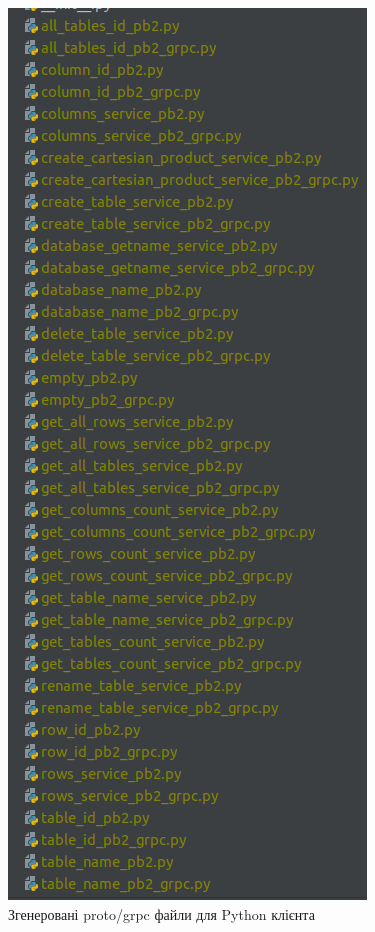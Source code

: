 \documentclass[a4paper, 12pt]{article}
\begin{document}
\begin{figure}[H]
\centering
\includegraphics[scale=0.5]{resources/gRpcPythonFiles.png}
\caption{Згенеровані proto/grpc файли для Python клієнта}
\end{figure}
\end{document}
